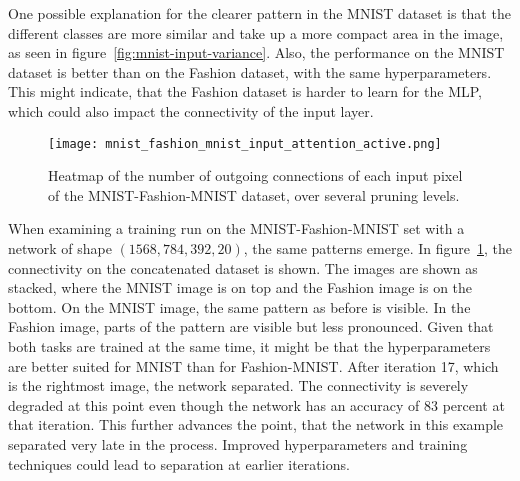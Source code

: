 One possible explanation for the clearer pattern in the MNIST dataset is that the different classes are more similar and take up a more compact area in the image, as seen in figure~\ref{fig:mnist-input-variance}.
Also, the performance on the MNIST dataset is better than on the Fashion dataset, with the same hyperparameters.
This might indicate, that the Fashion dataset is harder to learn for the {MLP}, which could also impact the connectivity of the input layer.

\begin{figure}[ht] %
    \centering
    \texttt{[image: mnist\_fashion\_mnist\_input\_attention\_active.png]}
    \caption[Pixel connectivity MNIST-Fashion-MNIST]{
    Heatmap of the number of outgoing connections of each input pixel of the MNIST-Fashion-MNIST dataset, over several pruning levels.}\label{fig:mnist-fashion-map}
\end{figure}

When examining a training run on the MNIST-Fashion-MNIST set with a network of shape $(1568, 784, 392, 20)$, the same patterns emerge.
In figure~\ref{fig:mnist-fashion-map}, the connectivity on the concatenated dataset is shown.
The images are shown as stacked, where the MNIST image is on top and the Fashion image is on the bottom.
On the MNIST image, the same pattern as before is visible.
In the Fashion image, parts of the pattern are visible but less pronounced.
Given that both tasks are trained at the same time, it might be that the hyperparameters are better suited for MNIST than for Fashion-{MNIST}.
After iteration 17, which is the rightmost image, the network separated.
The connectivity is severely degraded at this point even though the network has an accuracy of $83$ percent at that iteration.
This further advances the point, that the network in this example separated very late in the process.
Improved hyperparameters and training techniques could lead to separation at earlier iterations.
